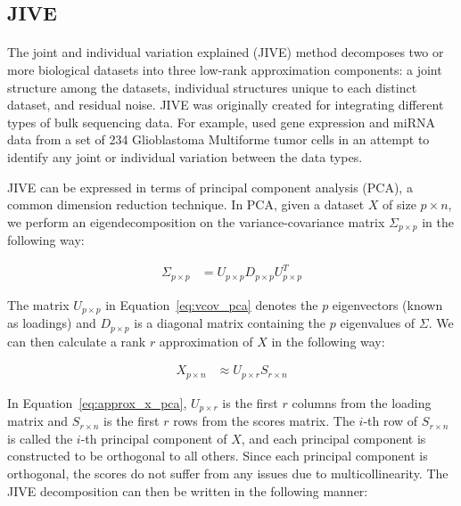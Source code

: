 \documentclass[unnumsec,webpdf,contemporary,large]{oup-authoring-template}%
\theoremstyle{thmstyleone}%
\theoremstyle{thmstyletwo}%
\theoremstyle{thmstylethree}%
\begin{document}
\subsection{JIVE}

\paragraph*{}
The joint and individual variation explained (JIVE) method \citep{lock2013joint} decomposes two or more biological datasets into three low-rank approximation components: a joint structure among the datasets, individual structures unique to each distinct dataset, and residual noise. JIVE was originally created for integrating different types of bulk sequencing data. For example, \citep{lock2013joint} used gene expression and miRNA data from a set of 234 Glioblastoma Multiforme tumor cells in an attempt to identify any joint or individual variation between the data types. 

JIVE can be expressed in terms of principal component analysis (PCA), a common dimension reduction technique. In PCA, given a dataset $X$ of size $p \times n$, we perform an eigendecomposition on the variance-covariance matrix $\Sigma_{p \times p}$ in the following way:

\begin{align}
    \Sigma_{p \times p} &= U_{p \times p} D_{p \times p} U_{p \times p}^T
    \label{eq:vcov_pca}
\end{align}

The matrix $U_{p \times p}$ in Equation~\ref{eq:vcov_pca} denotes the $p$ eigenvectors (known as loadings) and $D_{p \times p}$ is a diagonal matrix containing the $p$ eigenvalues of $\Sigma$. We can then calculate a rank $r$ approximation of $X$ in the following way:

\begin{align}
    X_{p \times n} &\approx U_{p \times r} S_{r \times n}
    \label{eq:approx_x_pca}
\end{align}

In Equation~\ref{eq:approx_x_pca}, $U_{p \times r}$ is the first $r$ columns from the loading matrix and $S_{r \times n}$ is the first $r$ rows from the scores matrix. The $i$-th row of $S_{r \times n}$ is called the $i$-th principal component of $X$, and each principal component is constructed to be orthogonal to all others. Since each principal component is orthogonal, the scores do not suffer from any issues due to multicollinearity. The JIVE decomposition can then be written in the following manner:
\end{document}
